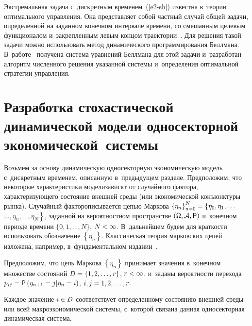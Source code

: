 \begin{multicols}{2}
     Экстремальная задача с~дискретным временем~(\ref{e2-sh}) 
известна в~теории оптимального управ\-ле\-ния. Она представляет собой частный 
случай общей задачи, определенной на заданном конечном интервале времени, со 
смешанным целевым функционалом и~закрепленным левым концом 
траектории~\cite{3-sh}. Для решения такой задачи можно использовать метод 
динамического программирования Беллмана. В~работе~\cite{8-sh} получена 
система уравнений Беллмана для этой задачи и~разработан алгоритм численного 
решения указанной сис\-те\-мы и~определения оптимальной стратегии управ\-ле\-ния.

\vspace*{-4pt}

\section{Разработка стохастической динамической модели 
односекторной экономической~системы}

\vspace*{-2pt}

     Возьмем за основу динамическую односекторную экономическую модель 
с~дискретным временем, описанную в~предыдущем разделе. Предположим, что 
некоторые характеристики модели\linebreak \mbox{зависят} от случайного фактора, 
ха\-рак\-те\-ри\-зу\-юще\-го со\-сто\-яние внеш\-ней среды (или экономической конъюнктуры 
рынка). Случайный фактор\linebreak описывается \mbox{цепью} Маркова $\left\{ 
\eta_n\right\}^N_{n=0}\hm= \left\{\eta_0, \eta_1, \ldots\right.$\linebreak $\left.\ldots , \eta_n, \ldots , \eta_N\right\}$, 
заданной на вероятностном пространстве  $(\Omega, \mathcal{A}, {\sf P})$ 
и~конечном периоде времени $\{ 0,1,\ldots , N\}$, $N\hm< \infty$. В~дальнейшем 
будем для крат\-кости использовать обозначение $\left\{ \eta_n\right\}$. Классическая 
тео\-рия марковских цепей изложена, например, в~фундаментальном 
     издании~\cite{9-sh}.
     
     Предположим, что цепь Маркова $\left\{ \eta_n\right\}$ принимает значения 
в~конечном множестве состояний $D\hm= \{1,2,\ldots , r\}$, $r\hm<\infty$, и~заданы 
вероятности перехода $p_{ij}\hm= {\sf P}\left( \eta_{n+1}=j \vert \eta_n=i\right)$, 
$i,j\hm= 1,2,\ldots , r$.
     
     Каждое значение $i\hm\in D$ соответствует определенному состоянию 
внешней среды или всей макроэкономической системы, с~которой связана данная 
односекторная динамическая система.
     

\end{multicols}

